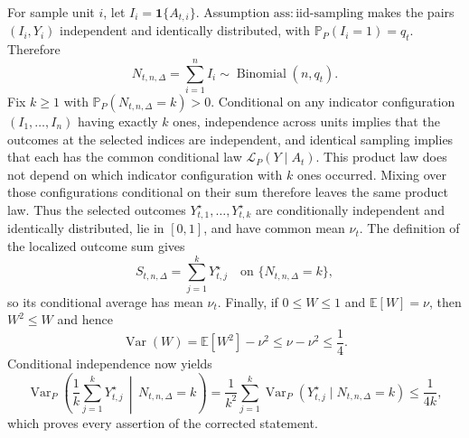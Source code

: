 For sample unit \(i\), let \(I_i=\mathbf1\{A_{t,i}\}\).  Assumption \(\mathrm{ass:iid\text{-}sampling}\) makes the pairs \((I_i,Y_i)\) independent and identically distributed, with \(\mathbb P_P(I_i=1)=q_t\).  Therefore
\[
 N_{t,n,\Delta}=\sum_{i=1}^n I_i\sim\operatorname{Binomial}(n,q_t).
\]
Fix \(k\geq1\) with \(\mathbb P_P(N_{t,n,\Delta}=k)>0\).  Conditional on any indicator configuration \((I_1,\ldots,I_n)\) having exactly \(k\) ones, independence across units implies that the outcomes at the selected indices are independent, and identical sampling implies that each has the common conditional law \(\mathcal L_P(Y\mid A_t)\).  This product law does not depend on which indicator configuration with \(k\) ones occurred.  Mixing over those configurations conditional on their sum therefore leaves the same product law.  Thus the selected outcomes \(Y_{t,1}^{\star},\ldots,Y_{t,k}^{\star}\) are conditionally independent and identically distributed, lie in \([0,1]\), and have common mean \(\nu_t\).  The definition of the localized outcome sum gives
\[
 S_{t,n,\Delta}=\sum_{j=1}^kY_{t,j}^{\star}
 \quad\text{on }\{N_{t,n,\Delta}=k\},
\]
so its conditional average has mean \(\nu_t\).  Finally, if \(0\leq W\leq1\) and \(\mathbb E[W]=\nu\), then \(W^2\leq W\) and hence
\[
 \operatorname{Var}(W)=\mathbb E[W^2]-\nu^2
 \leq\nu-\nu^2\leq\frac14.
\]
Conditional independence now yields
\[
 \operatorname{Var}_P\!\left(\frac1k\sum_{j=1}^kY_{t,j}^{\star}\,\middle|\,N_{t,n,\Delta}=k\right)
 =\frac1{k^2}\sum_{j=1}^k\operatorname{Var}_P(Y_{t,j}^{\star}\mid N_{t,n,\Delta}=k)
 \leq\frac1{4k},
\]
which proves every assertion of the corrected statement.